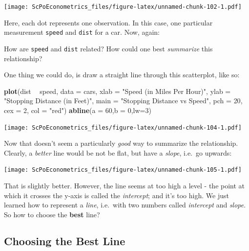 \documentclass[]{book}
\newenvironment{Shaded}{\begin{snugshade}}{\end{snugshade}}
\newcommand{\KeywordTok}[1]{\textcolor[rgb]{0.13,0.29,0.53}{\textbf{#1}}}
\newcommand{\DataTypeTok}[1]{\textcolor[rgb]{0.13,0.29,0.53}{#1}}
\newcommand{\DecValTok}[1]{\textcolor[rgb]{0.00,0.00,0.81}{#1}}
\newcommand{\StringTok}[1]{\textcolor[rgb]{0.31,0.60,0.02}{#1}}
\newcommand{\OperatorTok}[1]{\textcolor[rgb]{0.81,0.36,0.00}{\textbf{#1}}}
\newcommand{\NormalTok}[1]{#1}
\newenvironment{note}{\begin{tcolorbox}[colback=blue!5!white,colframe=blue!75!black,title=\textbf{Note:}]}{\end{tcolorbox}}
\theoremstyle{definition}
\theoremstyle{definition}
\theoremstyle{definition}
\theoremstyle{remark}
\begin{document}
\texttt{[image: ScPoEconometrics\_files/figure-latex/unnamed-chunk-102-1.pdf]}

Here, each dot represents one observation. In this case, one particular
measurement \texttt{speed} and \texttt{dist} for a car. Now, again:

\begin{note}
How are \texttt{speed} and \texttt{dist} related? How could one best
\emph{summarize} this relationship?
\end{note}

 One thing we could do, is draw a straight line through this
scatterplot, like so:

\begin{Shaded}
\begin{Highlighting}[]
\KeywordTok{plot}\NormalTok{(dist }\OperatorTok{~}\StringTok{ }\NormalTok{speed, }\DataTypeTok{data =}\NormalTok{ cars,}
     \DataTypeTok{xlab =} \StringTok{"Speed (in Miles Per Hour)"}\NormalTok{,}
     \DataTypeTok{ylab =} \StringTok{"Stopping Distance (in Feet)"}\NormalTok{,}
     \DataTypeTok{main =} \StringTok{"Stopping Distance vs Speed"}\NormalTok{,}
     \DataTypeTok{pch  =} \DecValTok{20}\NormalTok{,}
     \DataTypeTok{cex  =} \DecValTok{2}\NormalTok{,}
     \DataTypeTok{col  =} \StringTok{"red"}\NormalTok{)}
\KeywordTok{abline}\NormalTok{(}\DataTypeTok{a =} \DecValTok{60}\NormalTok{,}\DataTypeTok{b =} \DecValTok{0}\NormalTok{,}\DataTypeTok{lw=}\DecValTok{3}\NormalTok{)}
\end{Highlighting}
\end{Shaded}

\texttt{[image: ScPoEconometrics\_files/figure-latex/unnamed-chunk-104-1.pdf]}

Now that doesn't seem a particularly \emph{good} way to summarize the
relationship. Clearly, a \emph{better} line would be not be flat, but
have a \emph{slope}, i.e.~go upwards:

\texttt{[image: ScPoEconometrics\_files/figure-latex/unnamed-chunk-105-1.pdf]}

That is slightly better. However, the line seems at too high a level -
the point at which it crosses the y-axis is called the \emph{intercept};
and it's too high. We just learned how to represent a \emph{line},
i.e.~with two numbers called \emph{intercept} and \emph{slope}. So how
to choose the \textbf{best} line?

\subsection{Choosing the Best Line}\label{choosing-the-best-line}
\end{document}
